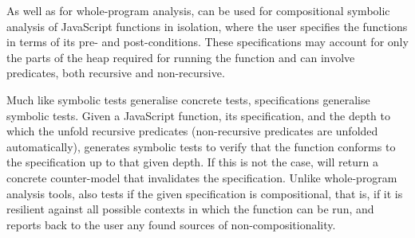 
As well as for whole-program analysis, \cosette can be used for compositional symbolic analysis of JavaScript functions in isolation, where the user specifies the functions in terms of its pre- and post-conditions. These specifications may account for only the parts of the heap required for running the function and can involve predicates, both recursive and non-recursive.

Much like symbolic tests generalise concrete tests, specifications generalise symbolic tests. Given a JavaScript function, its specification, and the depth to which the unfold recursive predicates (non-recursive predicates are unfolded automatically), \cosette generates symbolic tests to verify that the function conforms to the specification up to that given depth. If this is not the case, \cosette will return a concrete counter-model that invalidates the specification. Unlike whole-program analysis tools, \cosette also tests if the given specification is compositional, that is, if it is resilient against all possible contexts in which the function can be run, and reports back to the user any found sources of non-compositionality.

